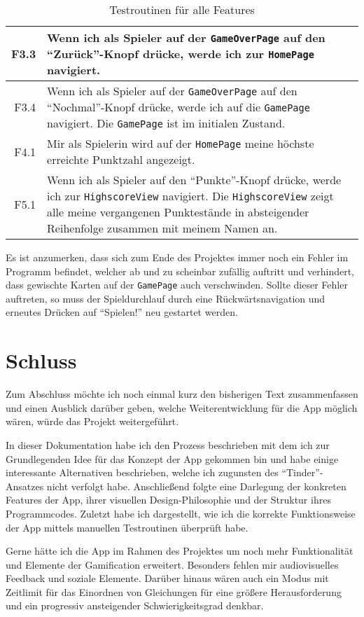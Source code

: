 \begin{table}
\begin{longtabu}{| >{\ttfamily} r | X |}
    \hline
    F3.3 & Wenn ich als Spieler auf der \texttt{GameOverPage} auf den \enquote{Zurück}-Knopf drücke, werde ich zur \texttt{HomePage} navigiert.\\
    \hline
    F3.4 & Wenn ich als Spieler auf der \texttt{GameOverPage} auf den \enquote{Nochmal}-Knopf drücke, werde ich auf die \texttt{GamePage} navigiert. Die \texttt{GamePage} ist im initialen Zustand.\\
    \hline
    F4.1 & Mir als Spielerin wird auf der \texttt{HomePage} meine höchste erreichte Punktzahl angezeigt.\\
    \hline
    F5.1 & Wenn ich als Spieler auf den \enquote{Punkte}-Knopf drücke, werde ich zur \texttt{HighscoreView} navigiert. Die \texttt{HighscoreView} zeigt alle meine vergangenen Punktestände in absteigender Reihenfolge zusammen mit meinem Namen an.\\
    \hline
  \end{longtabu}
  \caption{Testroutinen für alle Features}\label{tab:test-routines}
\end{table}

Es ist anzumerken, dass sich zum Ende des Projektes immer noch ein Fehler im Programm befindet, welcher ab und zu scheinbar zufällig auftritt und verhindert, dass gewischte Karten auf der \texttt{GamePage} auch verschwinden.
Sollte dieser Fehler auftreten, so muss der Spieldurchlauf durch eine Rückwärtsnavigation und erneutes Drücken auf \enquote{Spielen!} neu gestartet werden.

\section{Schluss}

Zum Abschluss möchte ich noch einmal kurz den bisherigen Text zusammenfassen und einen Ausblick darüber geben, welche Weiterentwicklung für die App möglich wären, würde das Projekt weitergeführt.

In dieser Dokumentation habe ich den Prozess beschrieben mit dem ich zur Grundlegenden Idee für das Konzept der App gekommen bin und habe einige interessante Alternativen beschrieben, welche ich zugunsten des \enquote{Tinder}-Ansatzes nicht verfolgt habe.
Anschließend folgte eine Darlegung der konkreten Features der App, ihrer visuellen Design-Philosophie und der Struktur ihres Programmcodes.
Zuletzt habe ich dargestellt, wie ich die korrekte Funktionsweise der App mittels manuellen Testroutinen überprüft habe.

Gerne hätte ich die App im Rahmen des Projektes um noch mehr Funktionalität und Elemente der Gamification erweitert.
Besonders fehlen mir audiovisuelles Feedback und soziale Elemente.
Darüber hinaus wären auch ein Modus mit Zeitlimit für das Einordnen von Gleichungen für eine größere Herausforderung und ein progressiv ansteigender Schwierigkeitsgrad denkbar.

